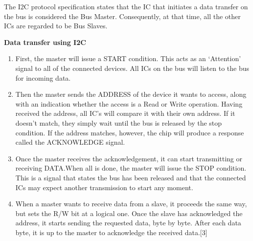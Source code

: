 \documentclass[11pt,a4paper]{article}
\begin{document}
	\newpage
	The I2C protocol specification states that the IC that initiates a data transfer on the bus is considered the Bus Master. Consequently, at that time, all the other ICs are regarded to be Bus Slaves. 
	
	\flushleft
	\textbf{Data transfer using I2C}
	\begin{enumerate}
		\item First, the master will issue a START condition. This acts as an ‘Attention’ signal to all of the connected devices. All ICs on the bus will listen to the bus for incoming data.
		\item Then the master sends the ADDRESS of the device it wants to access, along with an indication whether the access is a Read or Write operation. Having received the address, all IC’s will compare it with their own address. If it doesn’t match, they simply wait until the bus is released by the stop condition. If the address matches, however, the chip will produce a response called the ACKNOWLEDGE signal.
		\item Once the master receives the acknowledgement, it can start transmitting or receiving DATA.When all is done, the master will issue the STOP condition. This is a signal that states the bus has been released and that the connected ICs may expect another transmission to start any moment.
		\item When a master wants to receive data from a slave, it proceeds the same way, but sets the R/W bit at a logical one. Once the slave has acknowledged the address, it starts sending the requested data, byte by byte. After each data byte, it is up to the master to acknowledge the received data.[3]
	\end{enumerate}
	
\end{document}
